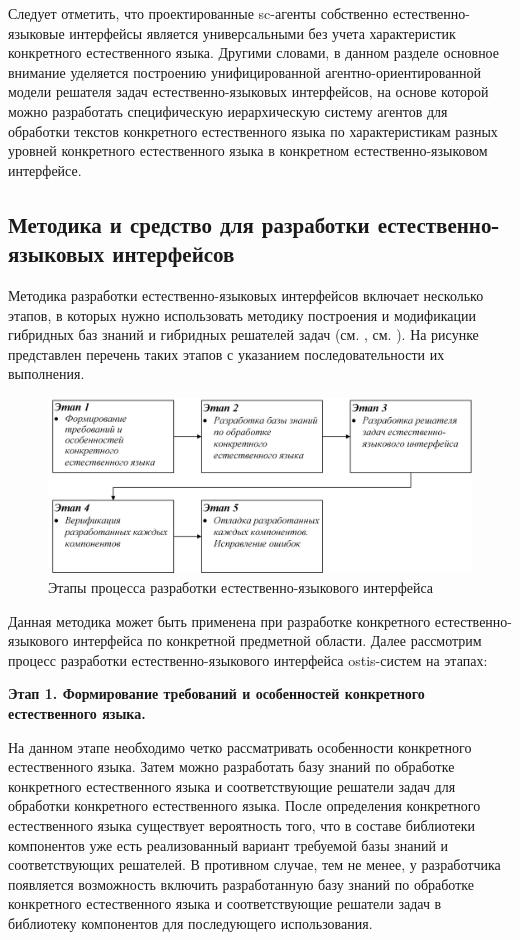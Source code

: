 Следует отметить, что проектированные sc-агенты собственно естественно-языковые интерфейсы является универсальными без учета характеристик конкретного естественного языка. Другими словами, в данном разделе основное внимание уделяется построению унифицированной агентно-ориентированной модели решателя задач естественно-языковых интерфейсов, на основе которой можно разработать специфическую иерархическую систему агентов для обработки текстов конкретного естественного языка по характеристикам разных уровней конкретного естественного языка в конкретном естественно-языковом интерфейсе.

\subsection{Методика и средство для разработки естественно-языковых интерфейсов}
Методика разработки естественно-языковых интерфейсов включает несколько этапов, в которых нужно использовать методику построения и модификации гибридных баз знаний и гибридных решателей задач (см. , см. ). На рисунке \textit{} представлен перечень таких этапов с указанием последовательности их выполнения.
\begin{figure}[H]
	\centering
	\includegraphics[scale=0.8,width=1.0\textwidth]{images/part4/chapter_chinese/method.png}
	\caption{Этапы процесса разработки естественно-языкового интерфейса}
	\label{fig:method-interface}
\end{figure}

Данная методика может быть применена при разработке конкретного естественно-языкового интерфейса по конкретной предметной области. Далее рассмотрим процесс разработки естественно-языкового интерфейса ostis-систем на этапах:

\textbf{Этап 1. Формирование требований и особенностей конкретного естественного языка.}

На данном этапе необходимо четко рассматривать особенности конкретного естественного языка. Затем можно разработать базу знаний по обработке конкретного естественного языка и соответствующие решатели задач для обработки конкретного естественного языка. После определения конкретного естественного языка существует вероятность того, что в составе библиотеки компонентов уже есть реализованный вариант требуемой базы знаний и соответствующих решателей. В противном случае, тем не менее, у разработчика появляется возможность включить разработанную базу знаний по обработке конкретного естественного языка и соответствующие решатели задач в библиотеку компонентов для последующего использования.

